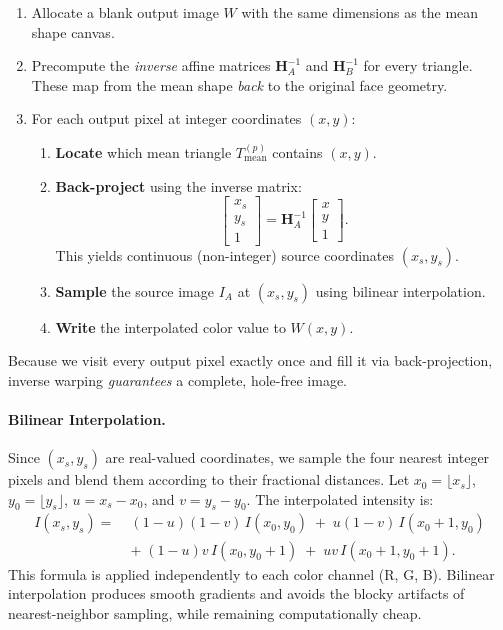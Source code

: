 \begin{enumerate}
    \item Allocate a blank output image $W$ with the same dimensions as the mean shape canvas.
    \item Precompute the \emph{inverse} affine matrices $\mathbf{H}_A^{-1}$ and $\mathbf{H}_B^{-1}$ for every triangle. These map from the mean shape \emph{back} to the original face geometry.
    \item For each output pixel at integer coordinates $(x, y)$:
    \begin{enumerate}
        \item \textbf{Locate} which mean triangle $T_{\text{mean}}^{(p)}$ contains $(x, y)$.
        \item \textbf{Back-project} using the inverse matrix:
        \begin{equation}
            \begin{bmatrix} x_s \\ y_s \\ 1 \end{bmatrix}
            = \mathbf{H}_A^{-1}
            \begin{bmatrix} x \\ y \\ 1 \end{bmatrix}.
        \end{equation}
        This yields continuous (non-integer) source coordinates $(x_s, y_s)$.
        \item \textbf{Sample} the source image $I_A$ at $(x_s, y_s)$ using bilinear interpolation.
        \item \textbf{Write} the interpolated color value to $W(x, y)$.
    \end{enumerate}
\end{enumerate}

Because we visit every output pixel exactly once and fill it via back-projection, inverse warping \emph{guarantees} a complete, hole-free image.

\paragraph{Bilinear Interpolation.}
Since $(x_s, y_s)$ are real-valued coordinates, we sample the four nearest integer pixels and blend them according to their fractional distances. Let $x_0 = \lfloor x_s \rfloor$, $y_0 = \lfloor y_s \rfloor$, $u = x_s - x_0$, and $v = y_s - y_0$. The interpolated intensity is:
\begin{align}
    I(x_s, y_s) =\; &(1-u)(1-v)\, I(x_0, y_0) \;+\; u(1-v)\, I(x_0+1, y_0) \nonumber \\
                  &+\; (1-u)v\, I(x_0, y_0+1) \;+\; uv\, I(x_0+1, y_0+1).
\end{align}
This formula is applied independently to each color channel (R, G, B). Bilinear interpolation produces smooth gradients and avoids the blocky artifacts of nearest-neighbor sampling, while remaining computationally cheap.

